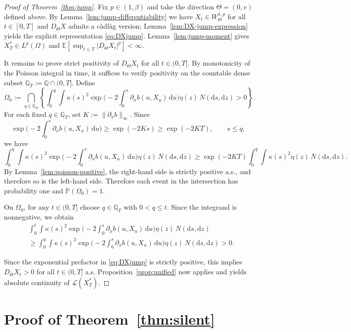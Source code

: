 \documentclass[11pt]{article}
\newcommand{\E}{\mathbb{E}}
\newcommand{\Pbb}{\mathbb{P}}
\newcommand{\1}{\mathbf{1}}
\newcommand{\law}{\mathcal{L}}
\newcommand{\dd}{\mathrm{d}}
\newcommand{\Xstar}{X^{\ast}}
\theoremstyle{plain}
\theoremstyle{definition}
\theoremstyle{remark}
\begin{document}
\begin{proof}[Proof of Theorem~\ref{thm:jump}]
Fix $p\in(1,\beta)$ and take the direction $\Theta=(0,v)$ defined above.
By Lemma~\ref{lem:jump-differentiability} we have $X_t\in W^{1,p}_\Theta$ for all $t\in[0,T]$ and $D_\Theta X$ admits a c\`adl\`ag version;
Lemma~\ref{lem:DX-jump-expression} yields the explicit representation \eqref{eq:DXjump}.
Lemma~\ref{lem:jump-moment} gives $\Xstar_T\in L^p(\Omega)$ and $\E[\sup_{t\le T}|D_\Theta X_t|^p]<\infty$.

\medskip
It remains to prove strict positivity of $D_\Theta X_t$ for all $t\in(0,T]$.
By monotonicity of the Poisson integral in time, it suffices to verify positivity on the countable dense subset $\mathbb{Q}_T:=\mathbb{Q}\cap(0,T]$.
Define
\[
\Omega_0:=\bigcap_{q\in\mathbb{Q}_T}\left\{\int_0^q\int \kappa(s)^2 \exp\Big(-2\int_0^s \partial_x b(u,X_u)\,\dd u\Big)\eta(z)\,N(\dd s,\dd z)>0\right\}.
\]
For each fixed $q\in\mathbb{Q}_T$, set $K:=\|\partial_x b\|_\infty$.
Since
\[
\exp\Big(-2\int_0^s \partial_x b(u,X_u)\,\dd u\Big)\ge \exp(-2Ks)\ge \exp(-2KT),\qquad s\le q,
\]
we have
\[
\int_0^q\int \kappa(s)^2 \exp\Big(-2\int_0^s \partial_x b(u,X_u)\,\dd u\Big)\eta(z)\,N(\dd s,\dd z)
\ge \exp(-2KT)\int_0^q\int \kappa(s)^2\eta(z)\,N(\dd s,\dd z).
\]
By Lemma~\ref{lem:poisson-positive}, the right-hand side is strictly positive a.s., and therefore so is the left-hand side.
Therefore each event in the intersection has probability one and $\Pbb(\Omega_0)=1$.

On $\Omega_0$, for any $t\in(0,T]$ choose $q\in\mathbb{Q}_T$ with $0<q\le t$.
Since the integrand is nonnegative, we obtain
\begin{align*}
    &\int_0^t\int \kappa(s)^2 \exp\Big(-2\int_0^s \partial_x b(u,X_u)\,\dd u\Big)\eta(z)\,N(\dd s,\dd z)\\
&\ge \int_0^q\int \kappa(s)^2 \exp\Big(-2\int_0^s \partial_x b(u,X_u)\,\dd u\Big)\eta(z)\,N(\dd s,\dd z)>0.
\end{align*}

Since the exponential prefactor in \eqref{eq:DXjump} is strictly positive, this implies $D_\Theta X_t>0$ for all $t\in(0,T]$ a.s.
Proposition~\ref{prop:unified} now applies and yields absolute continuity of $\law(\Xstar_T)$.
\end{proof}

\section{Proof of Theorem~\ref{thm:silent}}\label{sec:proof-silent}
\end{document}
